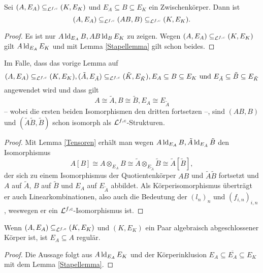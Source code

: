     \begin{lemma}\label{E-Erw}
    	Sei $(A,E_A)\subseteq_{\mathcal{L}^{f,c}}(K,E_K)$ und $E_A\subseteq B\subseteq E_K$ ein Zwischenkörper. Dann ist $$(A,E_A)\subseteq_{\mathcal{L}^{f,c}}(AB,B)\subseteq_{\mathcal{L}^{f,c}}(K,E_K).$$
    \end{lemma}
    \begin{proof}
    	Es ist nur $A\operatorname{ld}_{E_A}B,AB\operatorname{ld}_BE_K$ zu zeigen. Wegen $(A,E_A)\subseteq_{\mathcal{L}^{f,c}}(K,E_K)$ gilt $A\operatorname{ld}_{E_A}E_K$ und mit Lemma \ref{Stapellemma} gilt schon beides.
    \end{proof}
    \newpage
    \begin{lemma}\label{Fortsetzungslemma}
    	Im Falle, dass das vorige Lemma auf $$(A,E_A)\subseteq_{\mathcal{L}^{f,c}}(K,E_K),(\tilde{A},E_{\tilde{A}})\subseteq_{\mathcal{L}^{f,c}}(\tilde{K},E_{\tilde{K}}),E_A\subseteq B\subseteq E_K\text{ und }E_{\tilde{A}}\subseteq \tilde{B}\subseteq E_{\tilde{K}}$$ angewendet wird und dass gilt $$A\cong \tilde{A},B\cong \tilde{B},E_A\cong E_{\tilde{A}}$$ \--- wobei die ersten beiden Isomorphismen den dritten fortsetzen \---, sind $(AB,B)$ und $(\tilde{A}\tilde{B},\tilde{B})$ schon isomorph als $\mathcal{L}^{f,c}$-Strukturen.
    \end{lemma}
    \begin{proof}
    	Mit Lemma \ref{Tensoren} erhält man wegen $A\operatorname{ld}_{E_A}B,\tilde{A}\operatorname{ld}_{E_{\tilde{A}}}\tilde{B}$ den Isomorphismus $$A[B]\cong A\otimes_{E_A}B\cong \tilde{A}\otimes_{E_{\tilde{A}}}\tilde{B}\cong\tilde{A}[\tilde{B}],$$ der sich zu einem Isomorphismus der Quotientenkörper $AB$ und $\tilde{A}\tilde{B}$ fortsetzt und $A$ auf $\tilde{A}$, $B$ auf $\tilde{B}$ und $E_A$ auf $E_{\tilde{A}}$ abbildet. Als Körperisomorphismus überträgt er auch Linearkombinationen, also auch die Bedeutung der $(l_n)_n$ und $(f_{i,n})_{i,n}$, weswegen er ein $\mathcal{L}^{f,c}$-Isomorphismus ist.
    \end{proof}
    
    \begin{lemma}
    	Wenn $(A,E_A)\subseteq_{\mathcal{L}^{f,c}}(K,E_K)$ und $(K,E_K)$ ein Paar algebraisch abgeschlossener Körper ist, ist $E_A\subseteq A$ regulär.
    \end{lemma}
    \begin{proof}
    	Die Aussage folgt aus $A\operatorname{ld}_{E_A}E_K$ und der Körperinklusion $E_A\subseteq\overline{E_A}\subseteq E_K$ mit dem Lemma \ref{Stapellemma}.
    \end{proof}
    
